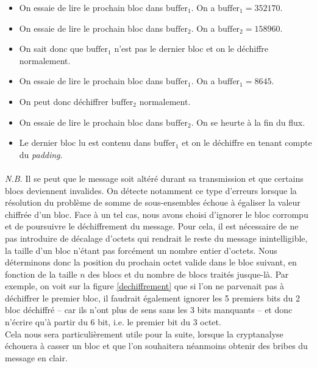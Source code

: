 \documentclass[a4paper,10pt]{article}
\begin{document}
\begin{itemize}
\item On essaie de lire le prochain bloc dans $\mathrm{buffer}_1$. On a $\mathrm{buffer}_1 = 352170$.
\item On essaie de lire le prochain bloc dans $\mathrm{buffer}_2$. On a $\mathrm{buffer}_2 = 158960$.
\item On sait donc que $\mathrm{buffer}_1$ n'est pas le dernier bloc et on le déchiffre normalement.
\item On essaie de lire le prochain bloc dans $\mathrm{buffer}_1$. On a $\mathrm{buffer}_1 = 8645$.
\item On peut donc déchiffrer $\mathrm{buffer}_2$ normalement.
\item On essaie de lire le prochain bloc dans $\mathrm{buffer}_2$. On se heurte à la fin du flux.
\item Le dernier bloc lu est contenu dans $\mathrm{buffer}_1$ et on le déchiffre en tenant compte du \textit{padding}.
\end{itemize}



\paragraph{} \textit{N.B.} Il se peut que le message soit altéré durant sa transmission et que certains blocs deviennent invalides. On détecte notamment ce type d'erreurs lorsque la résolution du problème de somme de sous-ensembles échoue à égaliser la valeur chiffrée d'un bloc. Face à un tel cas, nous avons choisi d'ignorer le bloc corrompu et de poursuivre le déchiffrement du message. Pour cela, il est nécessaire de ne pas introduire de décalage d'octets qui rendrait le reste du message inintelligible, la taille d'un bloc n'étant pas forcément un nombre entier d'octets. Nous déterminons donc la position du prochain octet valide dans le bloc suivant, en fonction de la taille $n$ des blocs et du nombre de blocs traités jusque-là. Par exemple, on voit sur la figure \ref{dechiffrement} que si l'on ne parvenait pas à déchiffrer le premier bloc, il faudrait également ignorer les 5 premiers bits du 2\ieme{} bloc déchiffré – car ils n'ont plus de sens sans les 3 bits manquants – et donc n'écrire qu'à partir du 6\ieme{} bit, i.e. le premier bit du 3\ieme{} octet.
\\
Cela nous sera particulièrement utile pour la suite, lorsque la cryptanalyse échouera à casser un bloc et que l'on souhaitera néanmoins obtenir des bribes du message en clair.
\end{document}
